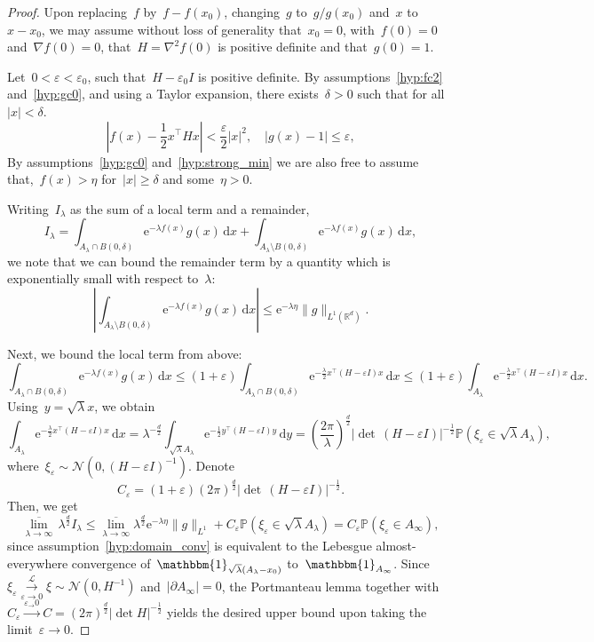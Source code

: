\documentclass[10pt]{article}
\newcommand{\cL}{\mathcal{L}}
\renewcommand{\d}{\mathrm{d}}
\newcommand{\e}{\mathrm{e}}
\renewcommand{\P}{\mathbb{P}}
\newcommand{\R}{\mathbb{R}}
\newcommand{\1}{\mathbbm 1}
\begin{document}
    \begin{proof}
        Upon replacing~$f$ by~$f-f(x_0)$, changing~$g$ to~$g/g(x_0)$ and~$x$ to~$x-x_0$, we may assume without loss of generality that~$x_0 = 0$, with~$f(0)=0$ and~$\nabla f(0) = 0$, that~$H=\nabla^2 f(0)$ is positive definite and that~$g(0)=1$.

        Let~$0<\varepsilon<\varepsilon_0$, such that~$H-\varepsilon_0 I$ is positive definite. By assumptions~\ref{hyp:fc2} and~\ref{hyp:gc0}, and using a Taylor expansion, there exists~$\delta>0$ such that for all~$|x|<\delta$.
       ~$$ \left|f(x)-\frac12x^\intercal H x \right|<\frac\varepsilon2 |x|^2,\quad |g(x)-1|\leq \varepsilon,$$
        By assumptions~\ref{hyp:gc0} and~\ref{hyp:strong_min} we are also free to assume that,~$f(x) > \eta$ for~$|x|\geq \delta$ and some~$\eta>0$.

        Writing~$I_\lambda$ as the sum of a local term and a remainder,
        \begin{equation}
            \label{eq:l7_pf1}
            I_\lambda = \int_{A_\lambda \cap B(0,\delta)} \e^{-\lambda f(x)}g(x)\,\d x + \int_{A_\lambda\setminus B(0,\delta)}\e^{-\lambda f(x)}g(x)\,\d x,
        \end{equation}
        we note that we can bound the remainder term by a quantity which is exponentially small with respect to~$\lambda$:
       ~$$\left|\int_{A_\lambda\setminus B(0,\delta)} \e^{-\lambda f(x)}g(x)\,\d x \right| \leq \e^{-\lambda \eta} \| g\|_{L^1(\R^d)}.$$

        Next, we bound the local term from above: 
        \[\int_{A_\lambda \cap B(0,\delta)} \e^{-\lambda f(x)}g(x)\,\d x \leq (1+\varepsilon)\int_{A_\lambda \cap B(0,\delta)}\e^{-\frac\lambda2x^\intercal (H-\varepsilon I) x}\,\d x \leq (1+\varepsilon)\int_{A_\lambda}\e^{-\frac\lambda 2x^\intercal(H-\varepsilon I)x}\,\d x.\]
        Using~$y=\sqrt\lambda x$, we obtain
        \[\int_{A_\lambda} \e^{-\frac\lambda2 x^\intercal (H-\varepsilon I)x}\,\d x  = \lambda^{-\frac d2}\int_{\sqrt\lambda A_\lambda}\e^{-\frac12 y^\intercal (H-\varepsilon I) y}\,\d y = \left(\frac{2\pi}\lambda\right)^{\frac d2}|\det\,(H-\varepsilon I)|^{-\frac12}\P(\xi_{\varepsilon} \in \sqrt\lambda A_\lambda),\]
        where~$\xi_\varepsilon \sim \mathcal N(0,(H-\varepsilon I)^{-1})$. Denote 
        \[C_\varepsilon = (1+\varepsilon)\left(2\pi\right)^{\frac d2}|\det\,(H-\varepsilon I)|^{-\frac12}.\]
        Then, we get
        \[\underset{\lambda\to\infty}{\overline{\lim}}\,\lambda^{\frac d2}{I_\lambda}\leq \underset{\lambda\to\infty}{\overline{\lim}} \lambda^{\frac d2}\e^{-\lambda\eta}\|g\|_{L^1}  + C_\varepsilon\P(\xi_\varepsilon\in\sqrt\lambda A_\lambda) = C_\varepsilon\P(\xi_\varepsilon \in A_\infty),\]
        since assumption~\ref{hyp:domain_conv} is equivalent to the Lebesgue almost-everywhere convergence of~$\mathbbm{1}_{\sqrt\lambda (A_\lambda-x_0)}$ to~$\mathbbm{1}_{A_\infty}$.
        Since~$\xi_\varepsilon \overset{\cL}{\underset{\varepsilon\to 0}{\longrightarrow}} \xi \sim \mathcal N(0,H^{-1})$ and~$|\partial A_\infty|=0$, the Portmanteau lemma together with~$C_\varepsilon \overset{\varepsilon_\to 0}{\longrightarrow} C = (2\pi)^{\frac d2} | \det H|^{-\frac12}$ yields the desired upper bound upon taking the limit~$\varepsilon\to 0$.


\end{proof}
\end{document}
